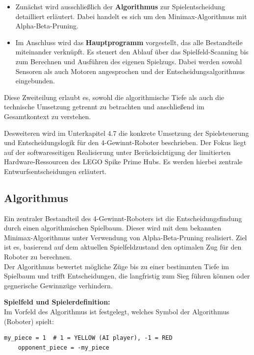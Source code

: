 \begin{itemize}
	\item Zunächst wird ausschließlich der \textbf{Algorithmus} zur Spielentscheidung detailliert erläutert. Dabei handelt es sich um den Minimax-Algorithmus mit Alpha-Beta-Pruning.
	
	\item Im Anschluss wird das \textbf{Hauptprogramm} vorgestellt, das alle Bestandteile miteinander verknüpft. Es steuert den Ablauf über das Spielfeld-Scanning bis zum Berechnen und Ausführen des eigenen Spielzugs. Dabei werden sowohl Sensoren als auch Motoren angesprochen und der Entscheidungsalgorithmus eingebunden.
\end{itemize}

Diese Zweiteilung erlaubt es, sowohl die algorithmische Tiefe als auch die technische Umsetzung getrennt zu betrachten und anschließend im Gesamtkontext zu verstehen.

Desweiteren wird im Unterkapitel 4.7 die konkrete Umsetzung der Spielsteuerung und Entscheidungslogik für den 4-Gewinnt-Roboter beschrieben. Der Fokus liegt auf der softwareseitigen Realisierung unter Berücksichtigung der limitierten Hardware-Ressourcen des LEGO Spike Prime Hubs. Es werden hierbei zentrale Entwurfsentscheidungen erläutert.


\subsection{Algorithmus}

Ein zentraler Bestandteil des 4-Gewinnt-Roboters ist die Entscheidungsfindung durch einen algorithmischen Spielbaum. Dieser wird mit dem bekannten Minimax-Algorithmus unter Verwendung von Alpha-Beta-Pruning realisiert. Ziel ist es, basierend auf dem aktuellen Spielfeldzustand den optimalen Zug für den Roboter zu berechnen.\\
Der Algorithmus bewertet mögliche Züge bis zu einer bestimmten Tiefe im Spielbaum und trifft Entscheidungen, die langfristig zum Sieg führen können oder gegnerische Gewinnzüge verhindern.

\textbf{Spielfeld und Spielerdefinition:}\\
Im Vorfeld des Algorithmus ist festgelegt, welches Symbol der Algorithmus (Roboter) spielt:

\begin{lstlisting}[style=pythonstyle]
	my_piece = 1  # 1 = YELLOW (AI player), -1 = RED
	opponent_piece = -my_piece
\end{lstlisting}

